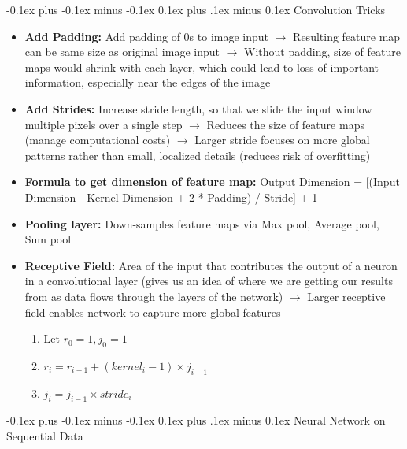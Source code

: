 \documentclass[landscape]{article}
\makeatletter
\renewcommand{\section}{\@startsection{section}{1}{0mm}%
  {-0.1ex plus -0.1ex minus -0.1ex}%
  {0.1ex plus .1ex minus 0.1ex}%
{\normalfont\small\bfseries}}
\renewcommand{\subsection}{\@startsection{subsection}{2}{0mm}%
  {-0.1ex plus -0.1ex minus -0.1ex}%
  {0.1ex plus .1ex minus 0.1ex}%
{\normalfont\scriptsize\bfseries}}
\makeatother
\begin{document}
\begin{multicols*}{5}
        \subsection{Convolution Tricks}
        \begin{itemize}
          \item \textbf{Add Padding:} Add padding of 0s to image input $\rightarrow$ Resulting feature map can be same size as original image input $\rightarrow$ Without padding, size of feature maps would shrink with each layer, which could lead to loss of important information, especially near the edges of the image
          \item \textbf{Add Strides:} Increase stride length, so that we slide the input window multiple pixels over a single step $\rightarrow$ Reduces the size of feature maps (manage computational costs) $\rightarrow$ Larger stride focuses on more global patterns rather than small, localized details (reduces risk of overfitting)
          \item \textbf{Formula to get dimension of feature map:} Output Dimension = [(Input Dimension - Kernel Dimension + 2 * Padding) / Stride] + 1
          \item \textbf{Pooling layer:} Down-samples feature maps via Max pool, Average pool, Sum pool
          \item \textbf{Receptive Field:} Area of the input that contributes the output of a neuron in a convolutional layer (gives us an idea of where we are getting our results from as data flows through the layers of the network) $\rightarrow$ Larger receptive field enables network to capture more global features
          \begin{enumerate}
            \item Let $r_0=1, j_0=1$
            \item $r_i=r_{i-1} + (kernel_i - 1)\times j_{i-1}$
            \item $j_i = j_{i-1} \times stride_i$
          \end{enumerate}
        \end{itemize}

        \section{Neural Network on Sequential Data}

\end{multicols*}
\end{document}

